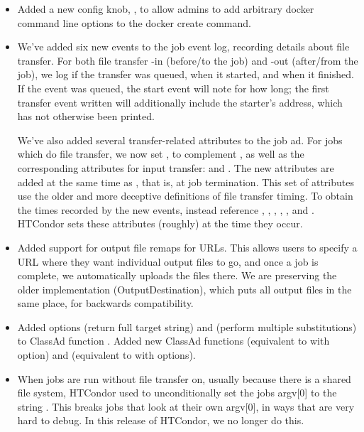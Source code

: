 \begin{itemize}
\item Added a new config knob, ,
to allow admins to add arbitrary docker command line options to
the docker create command.

\item We've added six new events to the job event log, recording details
about file transfer.  For both file transfer -in (before/to the job) and
-out (after/from the job), we log if the transfer was queued, when it started,
and when it finished.  If the event was queued, the start event will note
for how long; the first transfer event written will additionally include
the starter's address, which has not otherwise been printed.

We've also added several transfer-related attributes to the job ad.  For jobs
which do file transfer, we now set
, to complement
, as well as the corresponding
attributes for input transfer:
 and
.  The new attributes are added at
the same time as , that is, at
job termination.  This set of attributes use the older and more deceptive
definitions of file transfer timing.  To obtain the times recorded by the
new events, instead reference ,
, ,
, , and
.  HTCondor sets these attributes (roughly) at
the time they occur.

\item Added support for output file remaps for URLs. This allows users to 
specify a URL where they want individual output files to go, and once a job 
is complete, we automatically uploads the files there. We are preserving the 
older implementation (OutputDestination), which puts all output files in the 
same place, for backwards compatibility.

\item Added options  (return full target string) and 
(perform multiple substitutions) to ClassAd function .
Added new ClassAd functions  (equivalent to
 with  option) and 
(equivalent to  with  options).

\item When jobs are run without file transfer on, usually because there is a
shared file system, HTCondor used to unconditionally set the jobs argv[0]
to the string .  This breaks jobs that look at their own
argv[0], in ways that are very hard to debug.  In this release of HTCondor,
we no longer do this.

\end{itemize}

